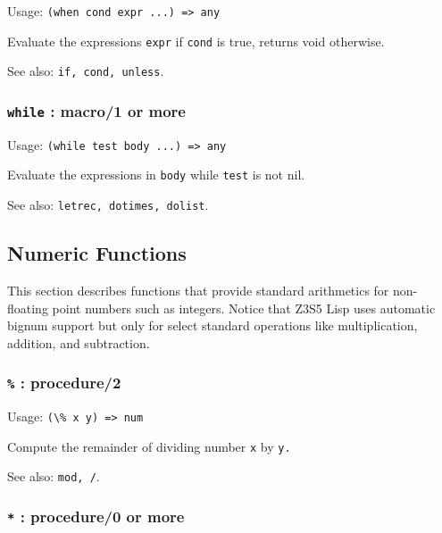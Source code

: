 \documentclass[
]{article}
\newcommand{\passthrough}[1]{#1}
\begin{document}
Usage: \passthrough{\lstinline!(when cond expr ...) => any!}

Evaluate the expressions \passthrough{\lstinline!expr!} if
\passthrough{\lstinline!cond!} is true, returns void otherwise.

See also: \passthrough{\lstinline!if, cond, unless!}.

\hypertarget{while-macro1-or-more}{%
\subsubsection{\texorpdfstring{\texttt{while} : macro/1 or
more}{while : macro/1 or more}}\label{while-macro1-or-more}}

Usage: \passthrough{\lstinline!(while test body ...) => any!}

Evaluate the expressions in \passthrough{\lstinline!body!} while
\passthrough{\lstinline!test!} is not nil.

See also: \passthrough{\lstinline!letrec, dotimes, dolist!}.

\hypertarget{numeric-functions}{%
\subsection{Numeric Functions}\label{numeric-functions}}

This section describes functions that provide standard arithmetics for
non-floating point numbers such as integers. Notice that Z3S5 Lisp uses
automatic bignum support but only for select standard operations like
multiplication, addition, and subtraction.

\hypertarget{procedure2}{%
\subsubsection{\texorpdfstring{\texttt{\%} :
procedure/2}{\% : procedure/2}}\label{procedure2}}

Usage: \passthrough{\lstinline!(\% x y) => num!}

Compute the remainder of dividing number \passthrough{\lstinline!x!} by
\passthrough{\lstinline!y.!}

See also: \passthrough{\lstinline!mod, /!}.

\hypertarget{procedure0-or-more}{%
\subsubsection{\texorpdfstring{\texttt{*} : procedure/0 or
more}{* : procedure/0 or more}}\label{procedure0-or-more}}
\end{document}
